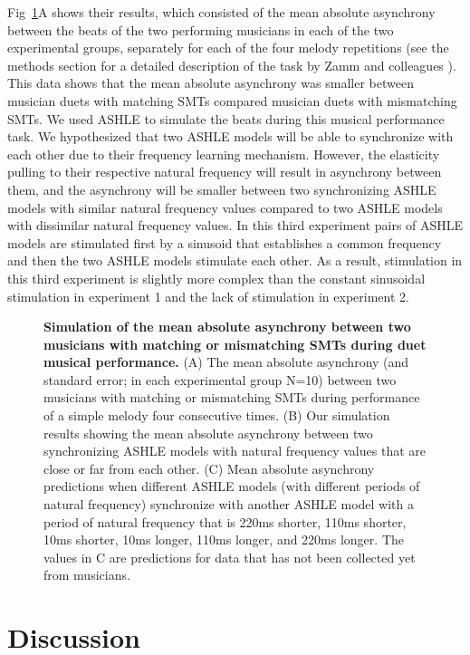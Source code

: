 \documentclass[10pt,letterpaper]{article}
\begin{document}
Fig~\ref{fig4}A shows their results, which consisted of the mean absolute asynchrony between the beats of the two performing musicians in each of the two experimental groups, separately for each of the four melody repetitions (see the methods section for a detailed description of the task by Zamm and colleagues \cite{zamm2016endogenous}). This data shows that the mean absolute asynchrony was smaller between musician duets with matching SMTs compared musician duets with mismatching SMTs. We used ASHLE to simulate the beats during this musical performance task. We hypothesized that two ASHLE models will be able to synchronize with each other due to their frequency learning mechanism. However, the elasticity pulling to their respective natural frequency will result in asynchrony between them, and the asynchrony will be smaller between two synchronizing ASHLE models with similar natural frequency values compared to two ASHLE models with dissimilar natural frequency values. In this third experiment pairs of ASHLE models are stimulated first by a sinusoid that establishes a common frequency and then the two ASHLE models stimulate each other. As a result, stimulation in this third experiment is slightly more complex than the constant sinusoidal stimulation in experiment 1 and the lack of stimulation in experiment 2.

\begin{figure}[!h]
\caption{{\bf Simulation of the mean absolute asynchrony between two musicians with matching or mismatching SMTs during duet musical performance.} (A) The mean absolute asynchrony (and standard error; in each experimental group N=10) between two musicians with matching or mismatching SMTs during performance of a simple melody four consecutive times. (B) Our simulation results showing the mean absolute asynchrony between two synchronizing ASHLE models with natural frequency values that are close or far from each other. (C) Mean absolute asynchrony predictions when different ASHLE models (with different periods of natural frequency) synchronize with another ASHLE model with a period of natural frequency that is 220ms shorter, 110ms shorter, 10ms shorter, 10ms longer, 110ms longer, and 220ms longer. The values in C are predictions for data that has not been collected yet from musicians.}
\label{fig4}
\end{figure}

\section*{Discussion}
\end{document}
